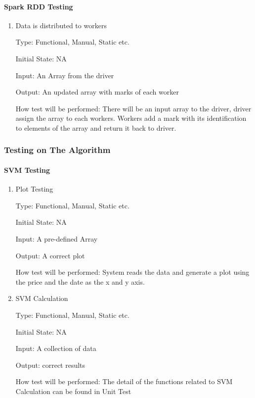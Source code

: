 \documentclass[12pt, titlepage]{article}
\begin{document}
\paragraph{ Spark RDD Testing}

\begin{enumerate}

\item{Data is distributed to workers\\}

Type: Functional,  Manual, Static etc.
					
Initial State: NA
					
Input: An Array from the driver
					
Output: An updated array with marks of each worker
					
How test will be performed: There will be an input array to the driver, driver assign the array to each workers. Workers add a mark with its identification to elements of the array and return it back to driver.

\end{enumerate}

\subsubsection{Testing on The Algorithm}

\paragraph{SVM Testing}

\begin{enumerate}

\item{Plot Testing\\}

Type: Functional,  Manual, Static etc.
					
Initial State: NA
					
Input: A pre-defined Array
					
Output: A correct plot
					
How test will be performed: System reads the data and generate a plot using the price and the date as the x and y axis.

\item{SVM Calculation \\}

Type: Functional,  Manual, Static etc.
					
Initial State: NA
					
Input: A collection of data
					
Output: correct results
					
How test will be performed: The detail of the functions related to SVM Calculation can be found in Unit Test

\end{enumerate}
\end{document}
